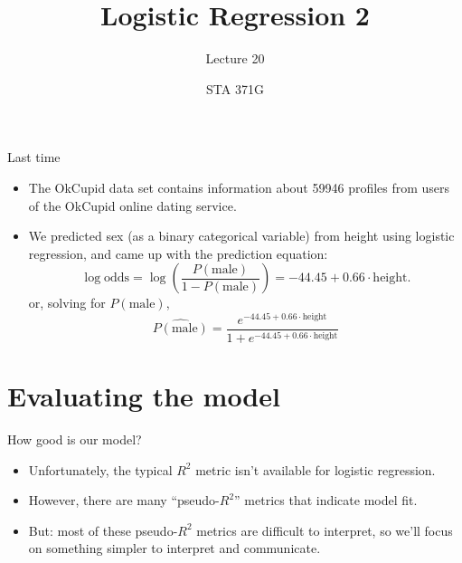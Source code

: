 \documentclass{beamer}\usepackage[]{graphicx}\usepackage[]{color}
\title{Logistic Regression 2}
\subtitle{Lecture 20}
\author{STA 371G}
\begin{document}
  
  

  \frame{\maketitle}



  \begin{darkframes}
    \begin{frame}{Last time}

      \begin{itemize}
        \item The OkCupid data set contains information about 59946 profiles from users of the OkCupid online dating service.
        \item We predicted sex (as a binary categorical variable) from height using logistic regression, and came up with the prediction equation:
        \[
          \log\text{odds} = \log\left(\frac{P(\text{male})}{1-P(\text{male})}\right) = -44.45 + 0.66\cdot\text{height}.
        \]
        or, solving for $P(\text{male})$,
        \[
          \widehat{P(\text{male})} = \frac{e^{-44.45 + 0.66\cdot\text{height}}}{1 + e^{-44.45 + 0.66\cdot\text{height}}}
        \]
      \end{itemize}
    \end{frame}

    \section{Evaluating the model}

    \begin{frame}{How good is our model?}
      \begin{itemize}[<+->]
        \item Unfortunately, the typical $R^2$ metric isn't available for logistic regression.
        \item However, there are many ``pseudo-$R^2$'' metrics that indicate model fit.
        \item But: most of these pseudo-$R^2$ metrics are difficult to interpret, so we'll focus on something simpler to interpret and communicate.
      \end{itemize}
    \end{frame}


\end{darkframes}
\end{document}
